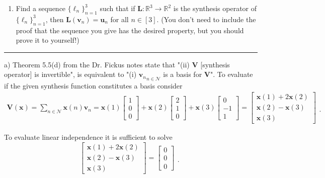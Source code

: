 \documentclass[12pt]{amsart}
\newcommand{\1}{\mathbbm{1}}
\newcounter{Theorem}
\numberwithin{equation}{section}
\numberwithin{Theorem}{section}
\theoremstyle{plain} %
\theoremstyle{definition}
\theoremstyle{remark}
\begin{document}
\begin{enumerate}[1.]
\begin{enumerate}
\bigskip

\item Find a sequence \(\{\boldsymbol{\ell}_{n}\}_{n=1}^{3}\) such that if \(\mathbf{L}:\mathbb{R}^{3}\to\mathbb{R}^{2}\) is the synthesis operator of \(\{\boldsymbol{\ell}_{n}\}_{n=1}^{3}\), then \(\mathbf{L}(\mathbf{v}_{n}) = \mathbf{u}_{n}\) for all \(n\in[3]\). (You don't need to include the proof that the sequence you give has the desired property, but you should prove it to yourself!)

\bigskip

\end{enumerate}
\hrule
\bigskip

a) Theorem 5.5(d) from the Dr. Fickus notes state that "(ii) $\mathbf{V}$ [synthesis operator] is invertible", is equivalent to "(i) ${\mathbf{v}_n}_{n\in \mathcal{N}}$ is a basis for $\mathbf{V}$". To evaluate if the given synthesis function constitutes a basis consider 
\begin{align*}
	\mathbf{V}(\mathbf{x}) = \sum_{n\in\mathcal{N}}\mathbf{x}(n)\mathbf{v}_n = 
	\mathbf{x}(1)\begin{bmatrix} 1 \\ 0 \\ 0 \end{bmatrix} +
	\mathbf{x}(2)\begin{bmatrix} 2 \\ 1 \\ 0 \end{bmatrix} +
	\mathbf{x}(3)\begin{bmatrix} 0 \\ -1 \\ 1 \end{bmatrix} =
	\begin{bmatrix}
		\mathbf{x}(1) + 2\mathbf{x}(2) \\
		\mathbf{x}(2) - \mathbf{x}(3) \\
		\mathbf{x}(3)
	\end{bmatrix}
	\begin{matrix} \\ \\ . \end{matrix}
\end{align*}


To evaluate linear independence it is sufficient to solve
\[
\begin{bmatrix}
	\mathbf{x}(1) + 2\mathbf{x}(2) \\
	\mathbf{x}(2) - \mathbf{x}(3) \\
	\mathbf{x}(3)
\end{bmatrix}
= 
\begin{bmatrix} 0 \\ 0 \\ 0 \end{bmatrix}
\begin{matrix} \\ \\ . \end{matrix}
\]


\end{enumerate}
\end{document}
